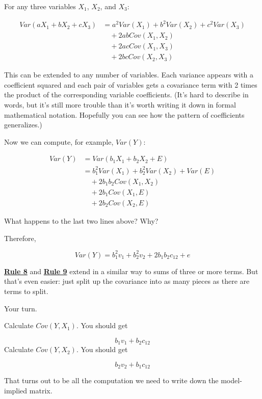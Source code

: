 \documentclass[
]{book}
\begin{document}
For any three variables \(X_{1}\), \(X_{2}\), and \(X_{3}\):

\begin{align}
Var(aX_{1} + bX_{2} + cX_{3}) &= 
    a^2Var(X_{1}) + b^2Var(X_{2}) + c^2Var(X_{3}) \\
    & \quad + 2abCov(X_{1}, X_{2}) \\
    & \quad + 2acCov(X_{1}, X_{3}) \\
    & \quad + 2bcCov(X_{2}, X_{3})
\end{align}

This can be extended to any number of variables. Each variance appears with a coefficient squared and each pair of variables gets a covariance term with 2 times the product of the corresponding variable coefficients. (It's hard to describe in words, but it's still more trouble than it's worth writing it down in formal mathematical notation. Hopefully you can see how the pattern of coefficients generalizes.)

Now we can compute, for example, \(Var(Y)\):

\begin{align}
Var(Y)  &= Var(b_{1}X_{1} + b_{2}X_{2} + E) \\
    &= b_{1}^{2} Var(X_{1}) + b_{2}^{2} Var(X_{2}) + Var(E) \\
    & \quad + 2b_{1}b_{2} Cov(X_{1}, X_{2}) \\
    & \quad + 2b_{1} Cov(X_{1}, E) \\
    & \quad + 2b_{2} Cov(X_{2}, E)
\end{align}

What happens to the last two lines above? Why?

Therefore,

\[
Var(Y) = b_{1}^{2} v_{1} + b_{2}^{2} v_{2} + 2b_{1}b_{2} c_{12} + e
\]

\href{./covariance.html\#Rule8}{\textbf{Rule 8}} and \href{./covariance.html\#Rule9}{\textbf{Rule 9}} extend in a similar way to sums of three or more terms. But that's even easier: just split up the covariance into as many pieces as there are terms to split.

Your turn.

Calculate \(Cov(Y, X_{1})\). You should get

\[
b_{1} v_{1} + b_{2} c_{12}
\]
Calculate \(Cov(Y, X_{2})\). You should get

\[
b_{2} v_{2} + b_{1} c_{12}
\]

That turns out to be all the computation we need to write down the model-implied matrix.
\end{document}
